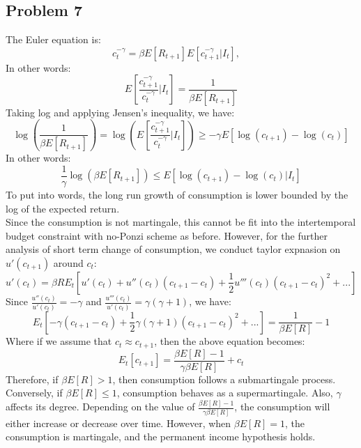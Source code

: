 \documentclass{article}
\begin{document}
\subsection{Problem 7}
The Euler equation is:
\begin{equation}
    c_t^{-\gamma} = \beta E\left[ R_{t+1}\right] E\left[c_{t+1}^{-\gamma}|I_t\right], \quad 
\end{equation}
In other words:
\begin{equation}
    E\left[\frac{c_{t+1}^{-\gamma}}{c_t^{-\gamma}}|I_t\right] = \frac{1}{\beta E\left[ R_{t+1}\right]}
\end{equation}
Taking log and applying Jensen's inequality, we have:
\begin{equation}
   \log \left( \frac{1}{\beta E\left[ R_{t+1}\right]} \right) = \log \left( E\left[\frac{c_{t+1}^{-\gamma}}{c_t^{-\gamma}}|I_t\right] \right) \geq -\gamma E\left[ \log(c_{t+1}) - \log(c_t) \right]
\end{equation}
In other words:
\begin{equation}
    \frac{1}{\gamma} \log \left( \beta E\left[ R_{t+1}\right] \right) \leq E\left[ \log(c_{t+1}) - \log(c_t) |I_t\right]
\end{equation}
To put into words, the long run growth of consumption is lower bounded by the log of the expected return. \\

Since the consumption is not martingale, this cannot be fit into the intertemporal budget constraint with no-Ponzi scheme as before.
However, for the further analysis of short term change of consumption, we conduct taylor expnasion on \(u'(c_{t+1})\) around \(c_t\):
\begin{equation}
    u'(c_t) = \beta R E_t \left[ u'(c_{t}) + u''(c_t)(c_{t+1} - c_t) + \frac{1}{2} u'''(c_t)(c_{t+1} - c_t)^2 + ... \right]
\end{equation}
Since \(\frac{u''(c_t)}{u'(c_t)} = -\gamma\) and \(\frac{u'''(c_t)}{u'(c_t)} = \gamma(\gamma+1)\), we have:
\begin{equation}
    E_t \left[ -\gamma(c_{t+1} - c_t) + \frac{1}{2} \gamma(\gamma+1)(c_{t+1} - c_t)^2 + ... \right] = \frac{1}{\beta E[R]} - 1
\end{equation}
Where if we assume that \(c_t \approx c_{t+1}\), then the above equation becomes:
\begin{equation}
    E_t \left[ c_{t+1} \right] = \frac{\beta E[R] - 1}{\gamma\beta E[R]} + c_t
\end{equation}
Therefore, if \(\beta E[R] > 1\), then consumption follows a submartingale process. 
Conversely, if \(\beta E[R] \leq 1\), consumption behaves as a supermartingale.
Also, \(\gamma\) affects its degree.
Depending on the value of \(\frac{\beta E[R] - 1}{\gamma\beta E[R]}\), the consumption will either increase or decrease over time.
However, when \(\beta E[R] = 1\), the consumption is martingale, and the permanent income hypothesis holds.
\end{document}
